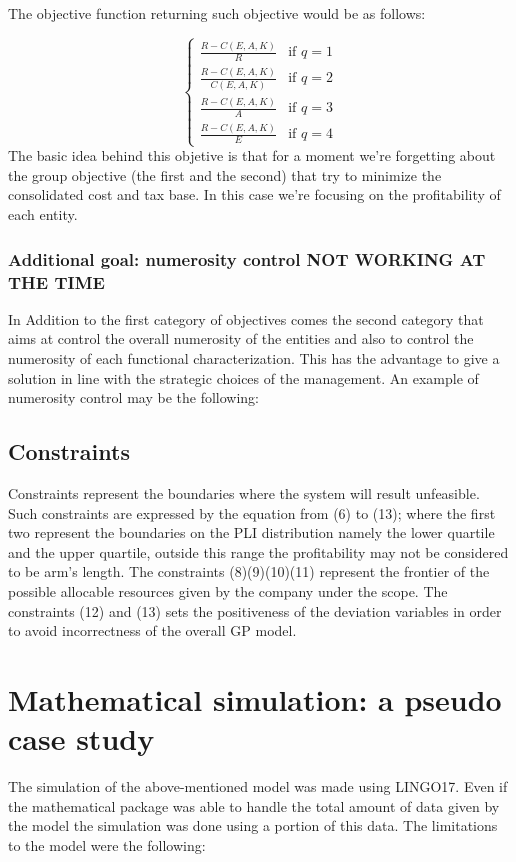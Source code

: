 \documentclass{article}
\begin{document}
The objective function returning such objective would be as follows:

\[
\begin{cases}
   \frac{R - C(E,A,K)}{R} & \text{if } q=1
   \\
   \frac{R - C(E,A,K)}{C(E,A,K)} & \text{if } q=2
   \\
   \frac{R - C(E,A,K)}{A} & \text{if } q=3
   \\
   \frac{R - C(E,A,K)}{E} & \text{if } q=4
\end{cases}
\]
The basic idea behind this objetive is that for a moment we're forgetting about the group objective (the first and the second) that try to minimize the consolidated cost and tax base. In this case we're focusing on the profitability of each entity.

\subsubsection{Additional goal: numerosity control NOT WORKING AT THE TIME}
In Addition to the first category of objectives comes the second category that aims at control the overall numerosity of the entities and also to control the numerosity of each functional characterization. This has the advantage to give a solution in line with the strategic choices of the management. An example of numerosity control may be the following:
\[
\]

\subsection{Constraints}
Constraints represent the boundaries where the system will result unfeasible. Such constraints are expressed by the equation from (6) to (13); where the first two represent the boundaries on the PLI distribution namely the lower quartile and the upper quartile, outside this range the profitability may not be considered to be arm's length. The constraints (8)(9)(10)(11) represent the frontier of the possible allocable resources given by the company under the scope. The constraints (12) and (13) sets the positiveness of the deviation variables in order to avoid incorrectness of the overall GP model. 


\section{Mathematical simulation: a pseudo case study}
The simulation of the above-mentioned model was made using LINGO17. Even if the mathematical package was able to handle the total amount of data given by the model the simulation was done using a portion of this data. The limitations to the model were the following:
\end{document}

